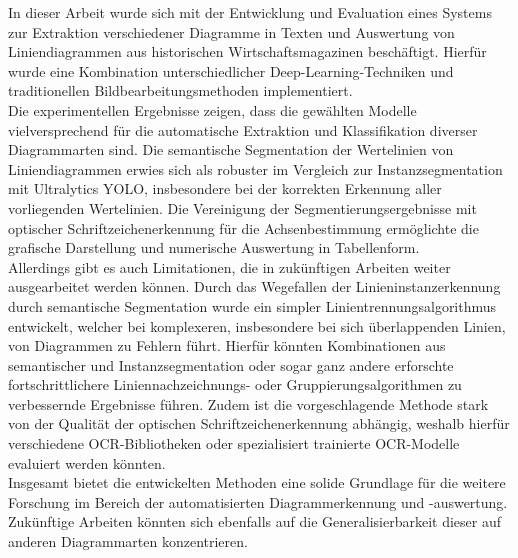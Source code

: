
In dieser Arbeit wurde sich mit der Entwicklung und Evaluation eines Systems zur Extraktion verschiedener Diagramme in Texten und Auswertung von Liniendiagrammen aus historischen Wirtschaftsmagazinen beschäftigt. Hierfür wurde eine Kombination unterschiedlicher Deep-Learning-Techniken und traditionellen Bildbearbeitungsmethoden implementiert.
\\
Die experimentellen Ergebnisse zeigen, dass die gewählten Modelle vielversprechend für die automatische Extraktion und Klassifikation diverser Diagrammarten sind. Die semantische Segmentation der Wertelinien von Liniendiagrammen erwies sich als robuster im Vergleich zur Instanzsegmentation mit Ultralytics YOLO, insbesondere bei der korrekten Erkennung aller vorliegenden Wertelinien. Die Vereinigung der Segmentierungsergebnisse mit optischer Schriftzeichenerkennung für die Achsenbestimmung ermöglichte die grafische Darstellung und numerische Auswertung in Tabellenform.
\\
Allerdings gibt es auch Limitationen, die in zukünftigen Arbeiten weiter ausgearbeitet werden können. Durch das Wegefallen der Linieninstanzerkennung durch semantische Segmentation wurde ein simpler Linientrennungsalgorithmus entwickelt, welcher bei komplexeren, insbesondere bei sich überlappenden Linien, von Diagrammen zu Fehlern führt. Hierfür könnten Kombinationen aus semantischer und Instanzsegmentation oder sogar ganz andere erforschte fortschrittlichere Liniennachzeichnungs- oder Gruppierungsalgorithmen zu verbessernde Ergebnisse führen. Zudem ist die vorgeschlagende Methode stark von der Qualität der optischen Schriftzeichenerkennung abhängig, weshalb hierfür verschiedene OCR-Bibliotheken oder spezialisiert trainierte OCR-Modelle evaluiert werden könnten.
\\
Insgesamt bietet die entwickelten Methoden eine solide Grundlage für die weitere Forschung im Bereich der automatisierten Diagrammerkennung und -auswertung. Zukünftige Arbeiten könnten sich ebenfalls auf die Generalisierbarkeit dieser auf anderen Diagrammarten konzentrieren.
